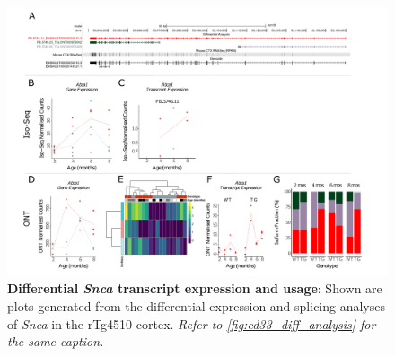 \begin{landscape}
	\begin{figure}[htp]
		\begin{center}
			\includegraphics[page=15,trim={0 0.5cm 0 1.5cm},scale =0.85]{Figures/TargetGene_DifferentialAnalysis.pdf}
		\end{center}
		\captionsetup{width=1.5\textwidth}
		\caption[Differential \textit{Snca} transcript expression and usage]%
		{\textbf{Differential \textit{Snca} transcript expression and usage}: Shown are plots generated from the differential expression and splicing analyses of \textit{Snca} in the rTg4510 cortex. \textit{Refer to \cref{fig:cd33_diff_analysis} for the same caption.}}   
		\label{fig:Snca_diff_analysis}
	\end{figure}
\end{landscape}

